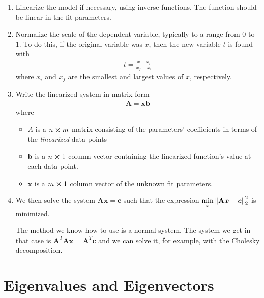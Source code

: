 \documentclass[11pt, a4paper]{article}
\newcommand{\mat}[1]{\mathbf{#1}} %
\begin{document}
\begin{enumerate}
	\item Linearize the model if necessary, using inverse functions. The function should be linear in the fit parameters.
	
	\item Normalize the scale of the dependent variable, typically to a range from $ 0 $ to $ 1 $. To do this, if the original variable was $ x $, then the new variable $ t $ is found with
	\begin{align*}
		t = \frac{x - x_i}{x_f - x_i}
	\end{align*}
	where $ x_i $ and $ x_f $ are the smallest and largest values of $ x $, respectively.
	
	\item Write the linearized system in matrix form
	\begin{align*}
		\mat{A} = \bm{x} \bm{b}
	\end{align*}
	where 
	\begin{itemize}
		\item $ A $ is a $ n \cross m $ matrix consisting of the parameters' coefficients in terms of the \textit{linearized} data points
		
		\item $ \bm{b} $ is a $ n \cross 1 $ column vector containing the linearized function's value at each data point.
		
		\item $ \bm{x} $ is a $ m \cross 1 $ column vector of the unknown fit parameters.
	\end{itemize}
	
	\item We then solve the system $ \mat{A} \bm{x} = \bm{c} $ such that the expression $ \displaystyle{\min_{x}\norm{\mat{A}\bm{x} - \bm{c}}_{2}^2 } $ is minimized. 
	
	The method we know how to use is a normal system. 
	The system we get in that case is $ \mat{A}^{T}\mat{A} \bm{x} = \mat{A}^{T}\bm{c} $ and we can solve it, for example, with the Cholesky decomposition.
\end{enumerate}
\fi

\newpage

\section{Eigenvalues and Eigenvectors}
\end{document}
